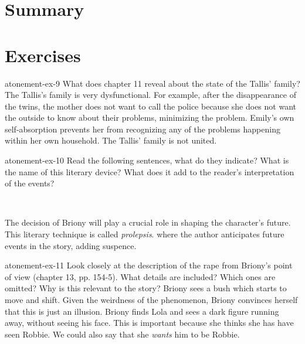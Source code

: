 \documentclass[preview]{standalone}
\begin{document}
\genpage

\section{Summary}

\section{Exercises}

\begin{snippetexercise}{atonement-ex-9}%
    {What does chapter 11 reveal about the state of the Tallis' family?}
    The Tallis's family is very dysfunctional.
    For example, after the disappearance of the twins,
    the mother does not want to call the police because she does not want
    the outside to know about their problems, minimizing the problem.
    Emily's own self-absorption prevents her from recognizing any of the problems
    happening within her own household. The Tallis' family is not united.
\end{snippetexercise}

\begin{snippetexercise}{atonement-ex-10}%
    {Read the following sentences, what do they indicate?
    What is the name of this literary device? What does
    it add to the reader's interpretation of the events?}
    \begin{center}
         \\
    \end{center}
    The decision of Briony will play a crucial role in shaping the character's future.
    This literary technique is called \textit{prolepsis}.
    where the author anticipates future events in the story, adding suspence.
\end{snippetexercise}

\begin{snippetexercise}{atonement-ex-11}%
    {Look closely at the description of the rape from Briony's point of view (chapter 13, pp. 154-5).
    What details are included? Which ones are omitted? Why is this relevant to the story?}
    Briony sees a bush which starts to move and shift. Given the weirdness of the phenomenon,
    Briony convinces herself that this is just an illusion.
    Briony finds Lola and sees a dark figure running away, without seeing his face.
    This is important because she thinks she has have seen Robbie.
    We could also say that she \textit{wants} him to be Robbie.
\end{snippetexercise}
\end{document}
